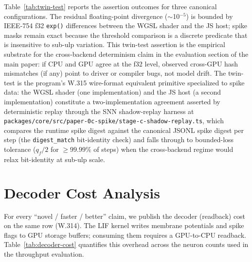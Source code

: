 \documentclass[10pt]{article}
\begin{document}
Table~\ref{tab:twin-test} reports the assertion outcomes for three canonical configurations.
The residual floating-point divergence ($\sim$10$^{-5}$) is bounded by IEEE-754 f32 \texttt{exp()} differences between the WGSL shader and the JS host; spike masks remain exact because the threshold comparison is a discrete predicate that is insensitive to sub-ulp variation.
This twin-test assertion is the empirical substrate for the cross-backend determinism claim in the evaluation section of the main paper: if CPU and GPU agree at the f32 level, observed cross-GPU hash mismatches (if any) point to driver or compiler bugs, not model drift. The twin-test is the program's W.315 wire-format equivalent primitive specialized to spike data: the WGSL shader (one implementation) and the JS host (a second implementation) constitute a two-implementation agreement asserted by deterministic replay through the SNN shadow-replay harness at \texttt{packages/core/src/paper-0c-spike/stage-c-shadow-replay.ts}, which compares the runtime spike digest against the canonical JSONL spike digest per step (the \texttt{digest\_match} bit-identity check) and falls through to bounded-loss tolerance ($q_f/2$ for $\geq 99.99\%$ of steps) when the cross-backend regime would relax bit-identity at sub-ulp scale.

\section{Decoder Cost Analysis}
\label{app:decoder-cost}

For every ``novel / faster / better'' claim, we publish the decoder (readback) cost on the same row (W.314).
The LIF kernel writes membrane potentials and spike flags to GPU storage buffers; consuming them requires a GPU-to-CPU readback.
Table~\ref{tab:decoder-cost} quantifies this overhead across the neuron counts used in the throughput evaluation.
\end{document}
